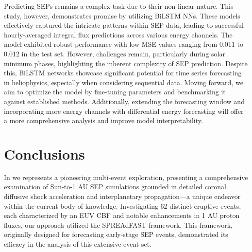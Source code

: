 Predicting SEPs remains a complex task due to their non-linear nature. This study, however, demonstrates promise by utilizing BiLSTM NNs. These models effectively captured the intricate patterns within SEP data, leading to successful hourly-averaged integral flux predictions across various energy channels. The model exhibited robust performance with low MSE values ranging from 0.011 to 0.012 in the test set. However, challenges remain, particularly during solar minimum phases, highlighting the inherent complexity of SEP prediction. Despite this, BiLSTM networks showcase significant potential for time series forecasting in heliophysics, especially when considering sequential data.  Moving forward, we aim to optimize the model by fine-tuning parameters and benchmarking it against established methods. Additionally, extending the forecasting window and incorporating more energy channels with differential energy forecasting will offer a more comprehensive analysis and improve model interpretability.

\section{Conclusions}
In \citet{kozarev_2022} we represents a pioneering multi-event exploration, presenting a comprehensive examination of Sun-to-1 AU SEP simulations grounded in detailed coronal diffusive shock acceleration and interplanetary propagation—a unique endeavor within the current body of knowledge. Investigating 62 distinct eruptive events, each characterized by an EUV CBF and notable enhancements in 1 AU proton fluxes, our approach utilized the SPREAdFAST framework. This framework, originally designed for forecasting early-stage SEP events, demonstrated its efficacy in the analysis of this extensive event set.

